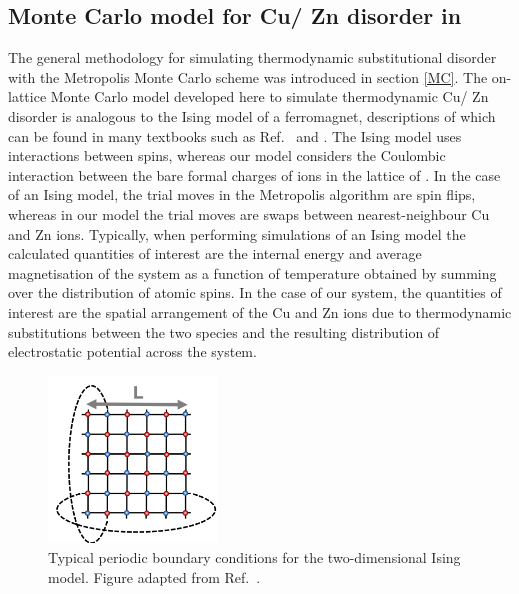 \documentclass[11pt, twoside]{report}
\begin{document}
\subsection{Monte Carlo model for Cu/ Zn disorder in {\CZTS}}\label{Eris}
The general methodology for simulating thermodynamic substitutional disorder with the Metropolis Monte Carlo scheme was introduced in section \ref{MC}. The on-lattice Monte Carlo model developed here to simulate thermodynamic Cu/ Zn disorder is analogous to the Ising model of a ferromagnet, descriptions of which can be found in many textbooks such as Ref.~ and . 
The Ising model uses interactions between spins, whereas our model considers the Coulombic interaction between the bare formal charges of ions in the lattice of {\CZTS}.
In the case of an Ising model, the trial moves in the Metropolis algorithm are spin flips, whereas in our model the trial moves are swaps between nearest-neighbour Cu and Zn ions. Typically, when performing simulations of an Ising model the calculated quantities of interest are the internal energy and average magnetisation of the system as a function of temperature obtained by summing over the distribution of atomic spins. In the case of our system, the quantities of interest are the spatial arrangement of the Cu and Zn ions due to thermodynamic substitutions between the two species and the resulting distribution of electrostatic potential across the system.

\begin{figure}[h!]
  \centering
    \includegraphics[width=0.4\textwidth]{figures/new_MC_PBCs.png}
    \caption[Typical periodic boundary conditions for the two-dimensional Ising model.]{Typical periodic boundary conditions for the two-dimensional Ising model. Figure adapted from Ref.~.}
  \label{MC_PBCs}
\end{figure}
\end{document}

